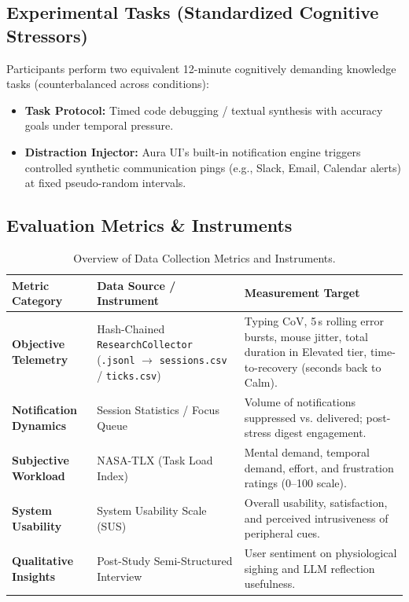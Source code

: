 \documentclass[11pt,a4paper]{article}
\begin{document}
\subsection{Experimental Tasks (Standardized Cognitive Stressors)}
Participants perform two equivalent 12-minute cognitively demanding knowledge tasks (counterbalanced across conditions):
\begin{itemize}[leftmargin=1.5em, itemsep=2pt]
    \item \textbf{Task Protocol:} Timed code debugging / textual synthesis with accuracy goals under temporal pressure.
    \item \textbf{Distraction Injector:} Aura UI's built-in notification engine triggers controlled synthetic communication pings (e.g., Slack, Email, Calendar alerts) at fixed pseudo-random intervals.
\end{itemize}

\subsection{Evaluation Metrics \& Instruments}
\begin{table}[htbp]
\centering
\small
\begin{tabularx}{\textwidth}{l p{4.6cm} X}
\toprule
\textbf{Metric Category} & \textbf{Data Source / Instrument} & \textbf{Measurement Target} \\
\midrule
\textbf{Objective Telemetry} & Hash-Chained \texttt{ResearchCollector} (\texttt{.jsonl} $\rightarrow$ \texttt{sessions.csv} / \texttt{ticks.csv}) & Typing CoV, 5\,s rolling error bursts, mouse jitter, total duration in Elevated tier, time-to-recovery (seconds back to Calm). \\
\textbf{Notification Dynamics} & Session Statistics / Focus Queue & Volume of notifications suppressed vs. delivered; post-stress digest engagement. \\
\textbf{Subjective Workload} & NASA-TLX (Task Load Index) & Mental demand, temporal demand, effort, and frustration ratings (0--100 scale). \\
\textbf{System Usability} & System Usability Scale (SUS) & Overall usability, satisfaction, and perceived intrusiveness of peripheral cues. \\
\textbf{Qualitative Insights} & Post-Study Semi-Structured Interview & User sentiment on physiological sighing and LLM reflection usefulness. \\
\bottomrule
\end{tabularx}
\caption{Overview of Data Collection Metrics and Instruments.}
\end{table}
\end{document}
